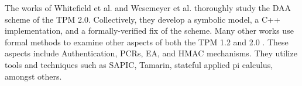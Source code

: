 The works of Whitefield et al. \cite{DAAAnalysis-Whit} and Wesemeyer et al. \cite{DAAAnalysis-Wes} thoroughly study the DAA scheme of the TPM 2.0. Collectively, they develop a symbolic model, a C++ implementation, and a formally-verified fix of the scheme. 
Many other works use formal methods to examine other aspects of both the TPM 1.2 \cite{AuthAnalysis,PCRAnalysis} and 2.0 \cite{EAAnalysis,HMACAnalysis}.
These aspects include Authentication, PCRs, EA, and HMAC mechanisms. They utilize tools and techniques such as SAPIC, Tamarin, stateful applied pi calculus, amongst others. 





